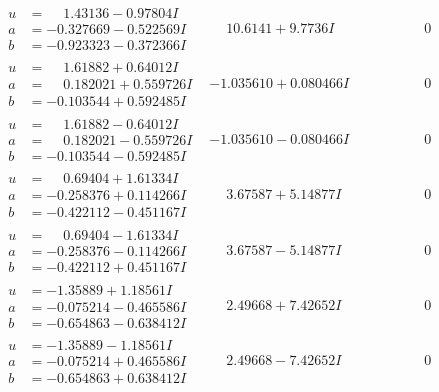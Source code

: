 \documentclass[1p]{elsarticle_modified}
\theoremstyle{definition}
\begin{document}
$$\begin{array}{c|c|c}
\begin{aligned}
u &= \phantom{-}1.43136 - 0.97804 I \\
a &= -0.327669 - 0.522569 I \\
b &= -0.923323 - 0.372366 I\end{aligned}
 & \phantom{-}10.6141 + 9.7736 I & \phantom{-0.000000 } 0 \\ \hline\begin{aligned}
u &= \phantom{-}1.61882 + 0.64012 I \\
a &= \phantom{-}0.182021 + 0.559726 I \\
b &= -0.103544 + 0.592485 I\end{aligned}
 & -1.035610 + 0.080466 I & \phantom{-0.000000 } 0 \\ \hline\begin{aligned}
u &= \phantom{-}1.61882 - 0.64012 I \\
a &= \phantom{-}0.182021 - 0.559726 I \\
b &= -0.103544 - 0.592485 I\end{aligned}
 & -1.035610 - 0.080466 I & \phantom{-0.000000 } 0 \\ \hline\begin{aligned}
u &= \phantom{-}0.69404 + 1.61334 I \\
a &= -0.258376 + 0.114266 I \\
b &= -0.422112 - 0.451167 I\end{aligned}
 & \phantom{-}3.67587 + 5.14877 I & \phantom{-0.000000 } 0 \\ \hline\begin{aligned}
u &= \phantom{-}0.69404 - 1.61334 I \\
a &= -0.258376 - 0.114266 I \\
b &= -0.422112 + 0.451167 I\end{aligned}
 & \phantom{-}3.67587 - 5.14877 I & \phantom{-0.000000 } 0 \\ \hline\begin{aligned}
u &= -1.35889 + 1.18561 I \\
a &= -0.075214 - 0.465586 I \\
b &= -0.654863 - 0.638412 I\end{aligned}
 & \phantom{-}2.49668 + 7.42652 I & \phantom{-0.000000 } 0 \\ \hline\begin{aligned}
u &= -1.35889 - 1.18561 I \\
a &= -0.075214 + 0.465586 I \\
b &= -0.654863 + 0.638412 I\end{aligned}
 & \phantom{-}2.49668 - 7.42652 I & \phantom{-0.000000 } 0 \\ \hline\begin{aligned}

\end{aligned}
\end{array}$$
\end{document}
